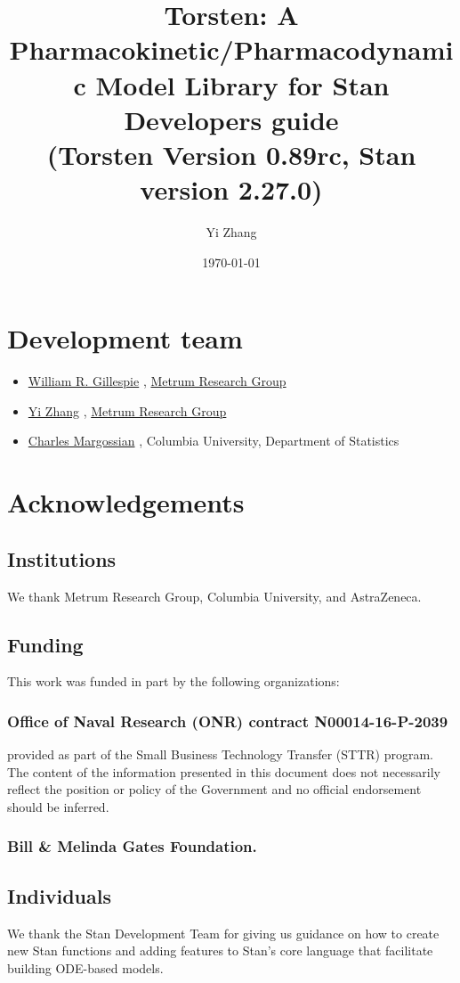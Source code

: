 \documentclass[12pt, reqno, oneside]{amsbook}
\author{Yi Zhang}
\date{\today}
\title{Torsten: A Pharmacokinetic/Pharmacodynamic Model Library for Stan\\\medskip
\large Developers guide \\  (Torsten Version 0.89rc, Stan version 2.27.0)}
\numberwithin{equation}{chapter}
\numberwithin{figure}{chapter}
\numberwithin{table}{chapter}
\theoremstyle{remark}
\begin{document}
\maketitle
\tableofcontents


\chapter*{Development team}
\label{sec:org662e417}
\begin{itemize}
\item \href{mailto:billg@metrumrg.com}{William R. Gillespie} , \href{https://www.metrumrg.com/}{Metrum Research Group}
\item \href{mailto:yiz@metrumrg.com}{Yi Zhang} , \href{https://www.metrumrg.com/}{Metrum Research Group}
\item \href{mailto:charles.margossian@columbia.edu}{Charles Margossian} , Columbia University, Department of Statistics
\end{itemize}
\chapter*{Acknowledgements}
\label{sec:orgf2a4332}
\section*{Institutions}
\label{sec:orgf26d7f1}
We thank Metrum Research Group, Columbia University, and AstraZeneca.
\section*{Funding}
\label{sec:org0d617d1}
This work was funded in part by the following organizations:
\subsection*{Office of Naval Research (ONR) contract N00014-16-P-2039}
\label{sec:org8283ce0}
provided as part of the Small Business Technology Transfer (STTR)
program. The content of the information presented in this document
does not necessarily reflect the position or policy of the
Government and no official endorsement should be inferred.
\subsection*{Bill \& Melinda Gates Foundation.}
\label{sec:org85b69f7}
\section*{Individuals}
\label{sec:orgd4473cb}
We thank the Stan Development Team for giving us guidance on how to
create new Stan functions and adding features to Stan's core language
that facilitate building ODE-based models.
\end{document}
